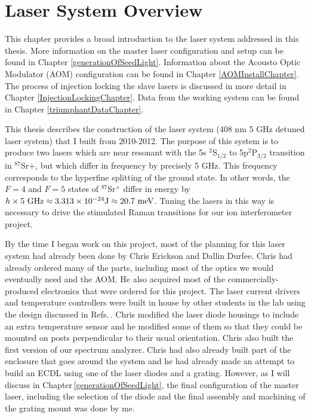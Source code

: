 \chapter{Laser System Overview}
\label{LaserSystemOverview}

This chapter provides a broad introduction to the laser system addressed in this thesis. More information on the master laser configuration and setup can be found in Chapter \ref{generationOfSeedLight}. Information about the Acousto Optic Modulator (AOM) configuration can be found in Chapter \ref{AOMInstallChapter}. The process of injection locking the slave lasers is discussed in more detail in Chapter \ref{InjectionLockingChapter}. Data from the working system can be found in Chapter \ref{triumphantDataChapter}.

This thesis describes the construction of the laser system (408 nm 5 GHz detuned laser system) that I built from 2010-2012. The purpose of this system is to produce two lasers which are near resonant with the 5s $^2$S$_{1/2}$ to 5p$^2$P$_{3/2}$ transition in $^{87}$Sr$+$, but which differ in frequency by precisely 5 GHz. This frequency corresponds to the hyperfine splitting of the ground state. In other words, the $F=4$ and $F=5$ states of $^{87}$Sr$^+$ differ in energy by $h\times 5\textnormal{ GHz}\approx 3.313 \times 10^{-24} \textnormal{J}\approx 20.7 \textnormal{ meV}$. Tuning the lasers in this way is necessary to drive the stimulated Raman transitions for our ion interferometer project. 

By the time I began work on this project, most of the planning for this laser system had already been done by Chris Erickson and Dallin Durfee. Chris had already ordered many of the parts, including most of the optics we would eventually need and the AOM. He also acquired most of the commercially-produced electronics that were ordered for this project. The laser current drivers and temperature controllers were built in house by other students in the lab using the design discussed in Refs.\,\cite{currentDriver1}\cite{currentDriverNote}\cite{cjeDiss}. Chris modified the laser diode housings to include an extra temperature sensor and he modified some of them so that they could be mounted on posts perpendicular to their usual orientation. Chris also built the first version of our spectrum analyzer. Chris had also already built part of the enclosure that goes around the system and he had already made an attempt to build an ECDL using one of the laser diodes and a grating. However, as I will discuss in Chapter\,\ref{generationOfSeedLight}, the final configuration of the master laser, including the selection of the diode and the final assembly and machining of the grating mount was done by me. 

